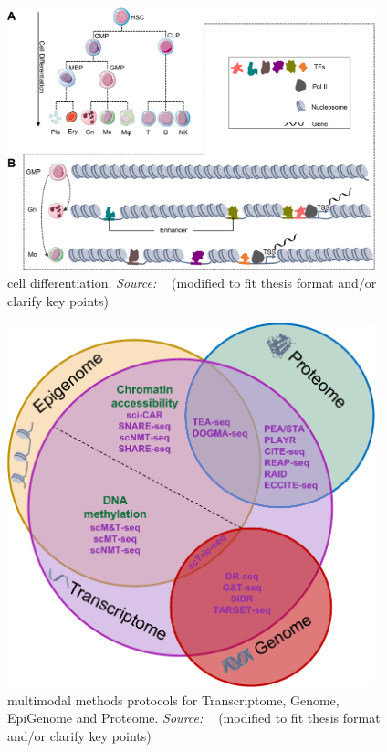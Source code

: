 \begin{figure}[!ht]
	\centering
	\includegraphics[width=0.95\textwidth]{cell_differentiation/fig}
	\vspace{0.1cm}
	\caption[cell differentiation]{cell differentiation. \emph{Source: ~\cite{lee2020single}} (modified to fit thesis format and/or clarify key points)}
	\label{fig:piechart-mulitmodal-methods}
\end{figure}



\begin{figure}[!ht]
	\centering
	\includegraphics[width=0.95\textwidth]{multi-model-methods/fig}
	\vspace{0.1cm}
	\caption[multimodal methods protocols for Transcriptome, Genome, EpiGenome and Proteome]{multimodal methods protocols for Transcriptome, Genome, EpiGenome and Proteome. \emph{Source: ~\cite{lee2020single}} (modified to fit thesis format and/or clarify key points)}
	\label{fig:piechart-mulitmodal-methods}
\end{figure}



